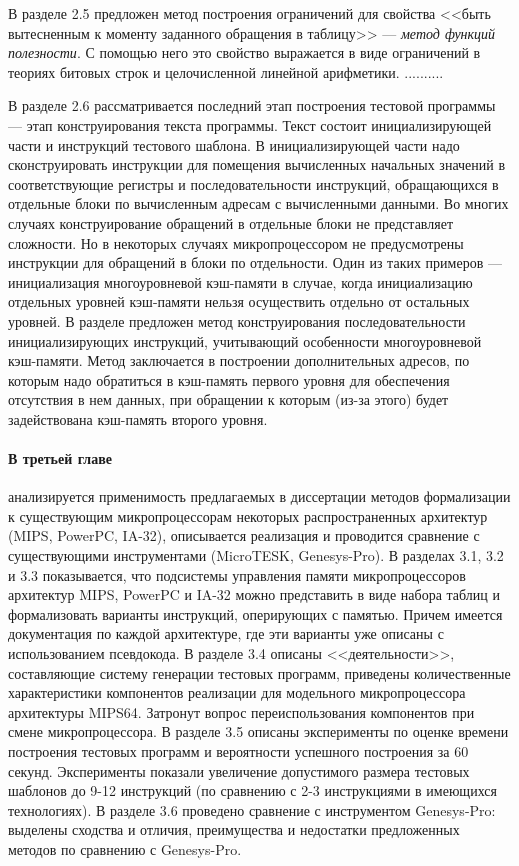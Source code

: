 \documentclass[14pt,autoref,href
,facsimile
]{disser}
\begin{document}
В разделе 2.5 предложен метод построения ограничений для свойства <<быть вытесненным к моменту заданного обращения в таблицу>> --- \emph{метод функций полезности}. С помощью него это свойство выражается в виде ограничений в теориях битовых строк и целочисленной линейной арифметики. ..........
 





В разделе 2.6 рассматривается последний этап построения тестовой программы --- этап конструирования текста программы. Текст состоит инициализирующей части и инструкций тестового шаблона. В инициализирующей части надо сконструировать инструкции для помещения вычисленных начальных значений в соответствующие регистры и последовательности инструкций, обращающихся в отдельные блоки по вычисленным адресам с вычисленными данными. Во многих случаях конструирование обращений в отдельные блоки не представляет сложности. Но в некоторых случаях микропроцессором не предусмотрены инструкции для обращений в блоки по отдельности. Один из таких примеров --- инициализация многоуровневой кэш-памяти в случае, когда инициализацию отдельных уровней кэш-памяти нельзя осуществить отдельно от остальных уровней. В разделе предложен метод конструирования последовательности инициализирующих инструкций, учитывающий особенности многоуровневой кэш-памяти. Метод заключается в построении дополнительных адресов, по которым надо обратиться в кэш-память первого уровня для обеспечения отсутствия в нем данных, при обращении к которым (из-за этого) будет задействована кэш-память второго уровня.

\paragraph{В третьей главе} анализируется применимость предлагаемых в диссертации методов формализации к существующим микропроцессорам некоторых распространенных архитектур (MIPS, PowerPC, IA-32), описывается реализация и проводится сравнение с существующими инструментами (MicroTESK, Genesys-Pro). В разделах 3.1, 3.2 и 3.3 показывается, что подсистемы управления памяти микропроцессоров архитектур MIPS, PowerPC и IA-32 можно представить в виде набора таблиц и формализовать варианты инструкций, оперирующих с памятью. Причем имеется документация по каждой архитектуре, где эти варианты уже описаны с использованием псевдокода. В разделе 3.4 описаны <<деятельности>>, составляющие систему генерации тестовых программ, приведены количественные характеристики компонентов реализации для модельного микропроцессора архитектуры MIPS64. Затронут вопрос переиспользования компонентов при смене микропроцессора. В разделе 3.5 описаны эксперименты по оценке времени построения тестовых программ и вероятности успешного построения за 60 секунд. Эксперименты показали увеличение допустимого размера тестовых шаблонов до 9-12 инструкций (по сравнению с 2-3 инструкциями в имеющихся технологиях). В разделе 3.6 проведено сравнение с инструментом Genesys-Pro: выделены сходства и отличия, преимущества и недостатки предложенных методов по сравнению с Genesys-Pro.
\end{document}
